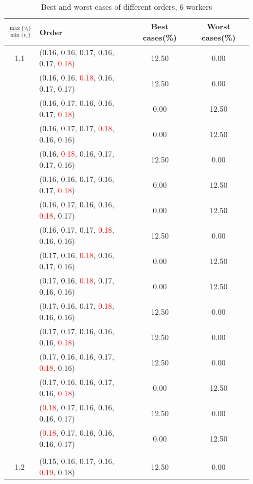 \documentclass[10pt,a4paper]{report}
\begin{document}
\newpage\begin{center}
	\small
	\begin{longtable}{clcc}
		\caption{Best and worst cases of different orders, 6 workers}\\
		\toprule
		\setlength{\tabcolsep}{1mm}
		\renewcommand\baselinestretch{0.5}\selectfont
		$\frac{\max\{v_i\}}{\min\{v_i\}}$ & Order & Best cases(\%) & Worst cases(\%) \\
			\midrule		1.1			&(\textcolor{black}{0.16}, 0.16, 0.17, 0.16, 0.17, \textcolor{red}{0.18})&12.50&0.00\\
			&(\textcolor{black}{0.16}, 0.16, \textcolor{red}{0.18}, 0.16, 0.17, 0.17)&12.50&0.00\\
			&(\textcolor{black}{0.16}, 0.17, 0.16, 0.16, 0.17, \textcolor{red}{0.18})&0.00&12.50\\
			&(\textcolor{black}{0.16}, 0.17, 0.17, \textcolor{red}{0.18}, 0.16, 0.16)&0.00&12.50\\
			&(\textcolor{black}{0.16}, \textcolor{red}{0.18}, 0.16, 0.17, 0.17, 0.16)&12.50&0.00\\
			&(0.16, \textcolor{black}{0.16}, 0.17, 0.16, 0.17, \textcolor{red}{0.18})&0.00&12.50\\
			&(0.16, 0.17, \textcolor{black}{0.16}, 0.16, \textcolor{red}{0.18}, 0.17)&0.00&12.50\\
			&(0.16, 0.17, 0.17, \textcolor{red}{0.18}, 0.16, \textcolor{black}{0.16})&12.50&0.00\\
			&(0.17, \textcolor{black}{0.16}, \textcolor{red}{0.18}, 0.16, 0.17, 0.16)&0.00&12.50\\
			&(0.17, \textcolor{black}{0.16}, \textcolor{red}{0.18}, 0.17, 0.16, 0.16)&0.00&12.50\\
			&(0.17, 0.16, 0.17, \textcolor{red}{0.18}, 0.16, \textcolor{black}{0.16})&12.50&0.00\\
			&(0.17, 0.17, \textcolor{black}{0.16}, 0.16, 0.16, \textcolor{red}{0.18})&12.50&0.00\\
			&(0.17, \textcolor{black}{0.16}, 0.16, 0.17, \textcolor{red}{0.18}, 0.16)&12.50&0.00\\
			&(0.17, 0.16, \textcolor{black}{0.16}, 0.17, 0.16, \textcolor{red}{0.18})&0.00&12.50\\
			&(\textcolor{red}{0.18}, 0.17, 0.16, \textcolor{black}{0.16}, 0.16, 0.17)&12.50&0.00\\
			&(\textcolor{red}{0.18}, 0.17, 0.16, 0.16, \textcolor{black}{0.16}, 0.17)&0.00&12.50\\
		&&&\\
		1.2			&(\textcolor{black}{0.15}, 0.16, 0.17, 0.16, \textcolor{red}{0.19}, 0.18)&12.50&0.00\\

\end{longtable}
\end{center}
\end{document}
